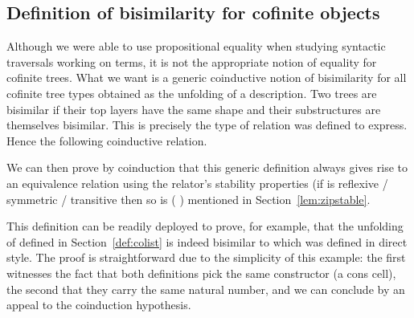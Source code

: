 
\subsection{Definition of bisimilarity for cofinite objects}

Although we were able to use propositional equality when studying
syntactic traversals working on terms, it is not the appropriate
notion of equality for cofinite trees. What we want is a generic
coinductive notion of bisimilarity for all cofinite tree types
obtained as the unfolding of a description. Two trees are bisimilar
if their top layers have the same shape and their substructures are
themselves bisimilar. This is precisely the type of relation 
was defined to express. Hence the following coinductive relation.

\begin{agdasnippet}
\end{agdasnippet}

We can then prove by coinduction that this generic definition always gives
rise to an equivalence relation using the relator's stability properties
(if  is reflexive / symmetric / transitive then so is {(   )}
mentioned in Section~\ref{lem:zipstable}.

\begin{agdasnippet}
\end{agdasnippet}

This definition can be readily deployed to prove, for example, that the unfolding
of  defined in Section~\ref{def:colist} is indeed bisimilar to 
which was defined in direct style. The proof is straightforward due to the simplicity
of this example: the first  witnesses the fact that both definitions
pick the same constructor (a cons cell), the second that they carry the
same natural number, and we can conclude by an appeal to the coinduction
hypothesis.

\begin{agdasnippet}
\end{agdasnippet}


